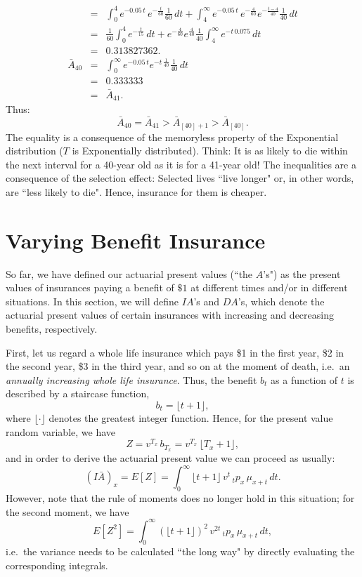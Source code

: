 \documentclass[11pt,fleqn,oneside]{book}
\begin{document}
\begin{enumerate}
\begin{eqnarray*}
&=& \int_0^4 e^{-0.05\,t}\,e^{-\frac{t}{60}} \frac{1}{60} \,dt + \int_4^\infty e^{-0.05\,t}\,e^{-\frac{4}{60}}e^{-\frac{t-4}{40}} \frac{1}{40} \,dt\\
&=& \frac{1}{60} \int_0^4 e^{-\frac{t}{15}}\,dt + e^{-\frac{4}{60}}e^{\frac{4}{40}} \frac{1}{40}
\int_4^{\infty} e^{-t\,0.075}\,dt\\
&=& 0.313827362.\\
{\bar{A}_{40}} &=& \int_0^{\infty} e^{-0.05\,t}e^{-t\,\frac{1}{40}}\frac{1}{40}\,dt\\
&=& 0.333333\\
&=& {\bar{A}_{41}}.
\end{eqnarray*}
Thus:
$$
{\bar{A}_{40}} = {\bar{A}_{41}} > {\bar{A}_{[40]+1}} > {\bar{A}_{[40]}}.
$$
The equality is a consequence of the memoryless property of the Exponential distribution ($T$ is Exponentially distributed). Think: It is as likely to die within the next interval for a 40-year old as it is for a 41-year old! The inequalities are a consequence of the selection effect: Selected lives ``live longer" or, in other words, are ``less likely to die". Hence, insurance for them is cheaper.

\end{enumerate}
\normalsize



\section{Varying Benefit Insurance}
\label{SECVARBENINS}
So far, we have defined our actuarial present values (``the $A$'s") as the present values of insurances paying a benefit of $\$1$ at different times and/or in different situations. In this section, we will define $IA$'s and $DA$'s, which denote the actuarial present values of certain insurances with increasing and decreasing benefits, respectively.

First, let us regard a whole life insurance which pays \$1 in the first year, \$2 in the second year, \$3 in the third year, and so on at the moment of death, i.e.\ an \textit{annually increasing whole life insurance}. Thus, the benefit $b_t$ as a function of $t$ is described by a staircase function,
$$
b_t = \lfloor t+1 \rfloor,
$$
where $\lfloor \cdot \rfloor$ denotes the greatest integer function. Hence, for the present value random variable, we have
$$
Z = v^{T_x}\,b_{T_x} = v^{T_x}\,\lfloor T_x + 1 \rfloor,
$$
and in order to derive the actuarial present value we can proceed as usually:
$$
\left(I\bar{A}\right)_x = E[Z] = \int_0^\infty \lfloor t+1 \rfloor \,v^t\,{_tp_x}\,{\mu_{x+t}}\,dt.
$$
However, note that the rule of moments does no longer hold in this situation; for the second moment, we have
$$
E[Z^2] = \int_0^\infty \left(\lfloor t+1 \rfloor\right)^2 \,v^{2t}\,{_tp_x}\,{\mu_{x+t}}\,dt,
$$
i.e.\ the variance needs to be calculated ``the long way" by directly evaluating the corresponding integrals.
\end{document}
